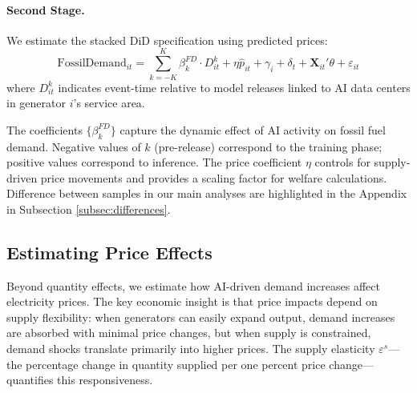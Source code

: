 \documentclass[sigconf]{acmart}
\newcommand{\nb}[1]{\textcolor{blue}{NB[#1]}}
\begin{document}
\paragraph{Second Stage.} We estimate the stacked DiD specification using predicted prices:
\begin{equation}
\text{FossilDemand}_{it} = \sum_{k=-K}^{K} \beta_k^{FD} \cdot D_{it}^k + \eta \hat{p}_{it} + \gamma_i + \delta_t + \mathbf{X}_{it}'\theta + \varepsilon_{it}
\label{eq:demand_eventstudy}
\end{equation}
where $D_{it}^k$ indicates event-time relative to model releases linked to AI data centers in generator $i$'s service area.

The coefficients $\{\beta_k^{FD}\}$ capture the dynamic effect of AI activity on fossil fuel demand. Negative values of $k$ (pre-release) correspond to the training phase; positive values correspond to inference. The price coefficient $\eta$ controls for supply-driven price movements and provides a scaling factor for welfare calculations. Difference between samples in our main analyses are highlighted in the Appendix in Subsection \ref{subsec:differences}.





\subsection{Estimating Price Effects}\label{PriceEffects}
Beyond quantity effects, we estimate how AI-driven demand increases affect electricity prices. The key economic insight is that price impacts depend on supply flexibility: when generators can easily expand output, demand increases are absorbed with minimal price changes, but when supply is constrained, demand shocks translate primarily into higher prices. The supply elasticity $\varepsilon^s$—the percentage change in quantity supplied per one percent price change—quantifies this responsiveness.
\end{document}
